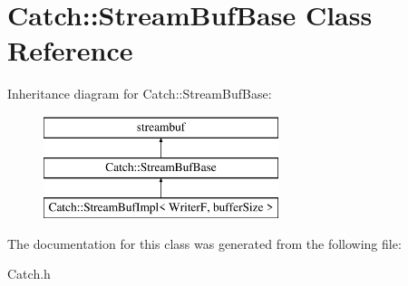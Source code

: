 \hypertarget{class_catch_1_1_stream_buf_base}{\section{Catch\-:\-:Stream\-Buf\-Base Class Reference}
\label{class_catch_1_1_stream_buf_base}
}
Inheritance diagram for Catch\-:\-:Stream\-Buf\-Base\-:\begin{figure}[H]
\begin{center}
\leavevmode
\includegraphics[height=3.000000cm]{class_catch_1_1_stream_buf_base}
\end{center}
\end{figure}


The documentation for this class was generated from the following file\-:\begin{DoxyCompactItemize}
\item 
Catch.\-h\end{DoxyCompactItemize}
